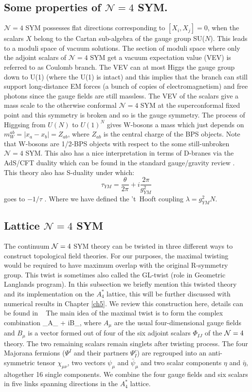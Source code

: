 \subsection{Some properties of $\mathcal{N} = 4$ SYM.} 
 $\mathcal{N} = 4$ SYM possesses flat directions corresponding to $ [X_{i}, X_{j}] = 0$, when the scalars $X$ belong to the 
 Cartan sub-algebra of the gauge group SU($N$). This leads to a moduli space of vacuum solutions. The section of moduli space where only the adjoint scalars of 
 $\mathcal{N} = 4$ SYM get a vacuum expectation value (VEV) is referred to as 
Coulomb branch. The VEV can at most Higgs the gauge group down to 
U(1) (where the U(1) is intact) and this implies that the branch can still 
support long-distance EM forces (a bunch of copies of electromagnetism) 
and free photons since the gauge fields are still massless. 
The VEV of the scalars give a mass scale to the otherwise conformal 
$\mathcal{N} = 4$ SYM at the superconformal fixed point
and this symmetry is broken and so is the gauge symmetry. The process of 
Higgsing from $U(N)$ to $U(1)^{N}$ gives W-bosons a mass which 
just depends on $ m_{W}^{ab}  = |x_a - x_b | = Z_{ab} $, where $Z_{ab}$ is the central charge of the BPS objects. 
Note that W-bosons are 1/2-BPS objects with respect to the some still-unbroken $\mathcal{N} = 4$ SYM. 
This also has a nice interpretation in terms of D-branes via the AdS/CFT duality which can be found in the standard 
gauge/gravity review \cite{Aharony:1999ti}. This theory also has S-duality under which:
\[ \tau_{YM} = \frac{\theta}{2\pi} + i \frac{2\pi}{g^{2}_{YM}} \]
goes to $ -1/\tau$ . Where we have defined the 't~Hooft coupling $ \lambda = g_{YM}^{2} N $. 


\subsection{\label{sec:latticeN4}Lattice  $\mathcal{N} = 4$ SYM}
The continuum $\mathcal N = 4$ SYM theory can be twisted in three different ways to construct topological field theories.
For our purposes, the maximal twisting ~\cite{Marcus:1995mq} would be required to have maximum overlap with the original 
R-symmetry group. This twist is sometimes also called the GL-twist (role in Geometric Langlands program). 
In this subsection we briefly mention this twisted theory and its implementation on the $A_4^*$ lattice, this will be 
further discussed with numerical results in Chapter \ref{ch5}. 
We review this construction here, details can be found in ~\cite{Kaplan:2005ta, Catterall:2009it}
The main idea of the maximal twist is to form the complex combination
\beq
  \label{4dgauge}
  \cA_\mu \equiv A_{\mu} + iB_{\mu},
\eeq
where $A_{\mu}$ are the usual four-dimensional gauge fields and $B_{\mu}$ is a vector formed out of four of the six adjoint scalars $\Phi_{IJ}$ of the $\mathcal N = 4$ theory.
The two remaining scalars remain singlets after twisting process.
The four Majorana fermions ($\Psi^I$ and their partners $\Psi^c_I$) are regrouped into an anti-symmetric tensor $\chi_{\mu\nu}$, 
two vectors $\psi_\mu$ and $\bar{\psi}_{\mu}$ and two scalar components $\eta$ and $\bar{\eta}$, altogether 16 single components.
We combine the four gauge fields and six scalars in five links spanning directions in the $A_{4}^{*}$ lattice. 

